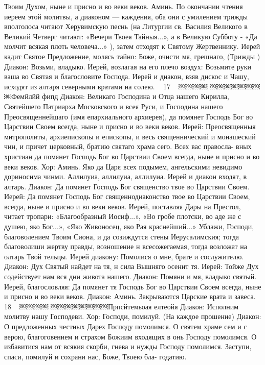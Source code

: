 Твоим Духом, ныне и присно и во веки веков. Аминь.
По окончании чтения иереем этой молитвы, а диаконом — каждения, оба они с умилением трижды вполголоса читают Херувимскую песнь (на Литургии св. Василия Великого в Великий Четверг читают: «Вечери Твоея Тайныя...», а в Великую Субботу - «Да молчит всякая плоть человеча...» ), затем отходят к Святому Жертвеннику.
Иерей кадит Святое Предложение, молясь тайно: Боже, очисти мя, грешнаго, (Трижды )
Диакон: Возьми, владыко.
Иерей, возлагая на его плечо воздух: Возьмите руки ваша во Святая и благословите Господа.
Иерей и диакон, взяв дискос и Чашу, исходят из алтаря северными вратами на солею.
~ 17 ~
￼￼￼￼
￼￼￼￼￼￼￼￼Фемйлйй фипд
Диакон: Великаго Господина и Отца нашего Кирилла, Святейшего Патриарха Московского и всея Руси, и Господина нашего Преосвященнейшаго (имя епархиального архиерея), да помянет Господь Бог во Царствии Своем всегда, ныне и присно и во веки веков.
Иерей: Преосвященныя митрополиты, архиепископы и епископы, и весь священнический и монашеский чин, и причет церковный, братию святаго храма сего. Всех вас правосла- вных христиан да помянет Господь Бог во Царствии Своем всегда, ныне и присно и во веки веков.
Хор: Аминь. Яко да Царя всех подымем, ангельскими невидимо дориносима чинми. Аллилуиа, аллилуиа, аллилуиа.
Иерей и диакон входят, в алтарь.
Диакон: Да помянет Господь Бог священство твое во Царствии Своем.
Иерей: Да помянет Господь Бог священнодиаконство твое во Царствии Своем, всегда, ныне и присно и во веки веков.
Иерей, поставляя Дары на Престол, читает тропари: «Благообразный Иосиф...», «Во гробе плотски, во аде же с душею, яко Бог...», «Яко Живоносец, яко Рая краснейший...» Ублажи, Господи, благоволением Твоим Сиона, и да созиждутся стены Иерусалимския; тогда благоволиши жертву правды, возношение н всесожегаемая, тогда возложат на олтарь Твой тельцы.
Иерей диакону: Помолися о мне, брате и сослужителю.
Диакон: Дух Святый найдет на тя, н сила Вышняго осенит тя.
Иерей: Тойже Дух содействует нам вся дни живота нашего.
Диакон: Помяни и мя, владыко святый.
Иерей, благословляя: Да помянет тя Господь Бог во Царствии Своем всегда, ныне и присно и во веки веков.
Диакон: Аминь.
Закрываются Царские врата и завеса.
~ 18 ~
￼￼￼￼
￼￼￼￼￼￼￼￼Прпсйтемьоая елтеойя
Диакон: Исполним молитву нашу Господеви.
Хор: Господи, помилуй. (На каждое прошение)
Диакон: О предложенных честных Дарех Господу помолимся. О святем храме сем и с верою, благоговением и страхом Божиим входящих в онь Господу помолимся.
О избавитися нам от всякия скорби, гнева и нужды Господу помолимся.
Заступи, спаси, помилуй и сохрани нас, Боже, Твоею бла- годатию.
